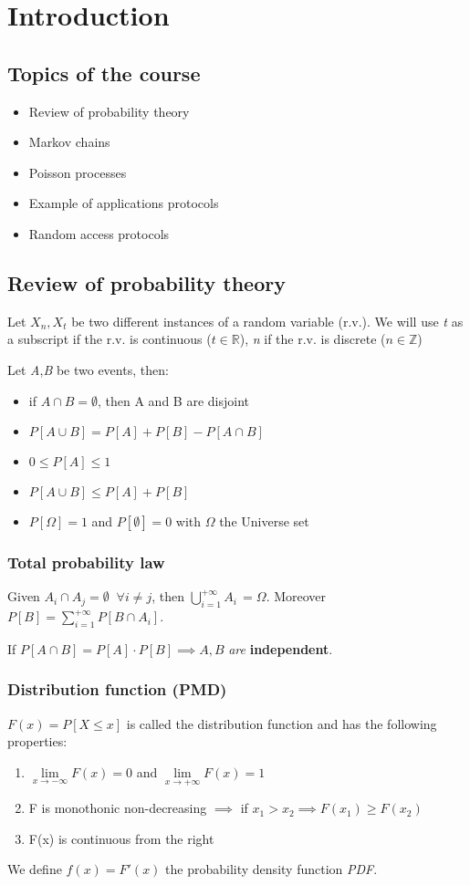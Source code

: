 \chapter{Introduction}
\section{Topics of the course}
\begin{itemize}
  \item Review of probability theory
  \item Markov chains
  \item Poisson processes
  \item Example of applications protocols
  \item Random access protocols
\end{itemize}
\section{Review of probability theory}
Let $X_n, X_t$ be two different instances of a random variable (r.v.). We will use
\textit{t} as a subscript if the r.v. is continuous ($t \in \mathbb{R}$), \textit{n} if the r.v. is discrete ($ n \in \mathbb{Z}$)

Let \textit{A},\textit{B} be two events, then:
\begin{itemize}
  \item if $A \cap B = \emptyset$, then A and B are disjoint
  \item $P[A \cup B] = P[A]+P[B] - P[A \cap B]$
  \item $0\le P[A] \le 1$
  \item $P[A \cup B] \le P[A]+P[B]$
  \item $ P[\Omega]=1 $ and $P[\emptyset]=0$ with $\Omega$ the Universe set
\end{itemize}
\subsection{Total probability law}
Given $A_i \cap A_j = \emptyset \;\; \forall i \neq j $, then $\bigcup\limits_{i=1}^{+\infty} A_i \, = \Omega$.
Moreover $P[B]=\sum\limits_{i=1}^{+\infty} P[B \cap A_i]$.

If $P[A \cap B] = P[A]\cdot P[B] \implies A,B$ \textit{are} \textbf{independent}.

\subsection{Distribution function (PMD)}\label{sec:pmd}
$F(x) = P[X \le x]$ is called the distribution function and has the following properties:
\begin{enumerate}
  \item $\lim\limits_{x \to -\infty} F(x) = 0$ \quad and \quad $\lim\limits_{x \to +\infty} F(x) = 1$
  \item F is monothonic non-decreasing $\implies$ if $x_1 > x_2 \implies F(x_1)\ge F(x_2)$
  \item F(x) is continuous from the right
\end{enumerate}
We define $f(x)=F'(x)$ the probability density function \textit{PDF}.

